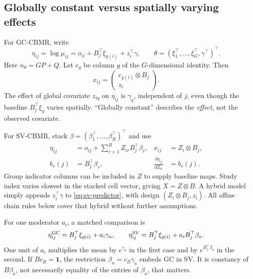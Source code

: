 \documentclass[11pt,a4paper]{article}
\numberwithin{equation}{section}
\begin{document}
\subsection{Globally constant versus spatially varying effects}
For GC-CBMR, write
\begin{equation}\label{eq:gc-predictor}
 \eta_{ij}=\log\mu_{ij}
 =o_{ij}+B_j^\top\xi_{g(i)}+z_i^\top\gamma,\qquad
 \theta=(\xi_1^\top,\ldots,\xi_G^\top,\gamma^\top)^\top.
\end{equation}
Here $n_\theta=GP+Q$. Let $e_g$ be column $g$ of the $G$-dimensional identity.
Then
\begin{equation}
 x_{ij}=\begin{pmatrix}e_{g(i)}\otimes B_j\\z_i\end{pmatrix}.
\end{equation}
The effect of global covariate $z_{iq}$ on $\eta_{ij}$ is $\gamma_q$,
independent of $j$, even though the baseline $B_j^\top\xi_g$ varies spatially.
``Globally constant'' describes the \emph{effect}, not the observed covariate.

For SV-CBMR, stack $\beta=(\beta_1^\top,\ldots,\beta_R^\top)^\top$ and use
\begin{align}
 \eta_{ij}&=o_{ij}+\sum_{r=1}^R Z_{ir}B_j^\top\beta_r,
 &x_{ij}&=Z_i\otimes B_j,\label{eq:sv-predictor}\\
 b_r(j)&=B_j^\top\beta_r,
 &\frac{\partial\eta_{ij}}{\partial Z_{ir}}&=b_r(j).
\end{align}
Group indicator columns can be included in $Z$ to supply baseline maps.
Study index varies slowest in the stacked cell vector, giving $X=Z\otimes B$.
A hybrid model simply appends $z_i^\top\gamma$ to
\eqref{eq:sv-predictor}, with design $(Z_i\otimes B_j,z_i)$.
All affine chain rules below cover that hybrid without further assumptions.

For one moderator $a_i$, a matched comparison is
\[
 \eta_{ij}^{\rm GC}=B_j^\top\xi_{g(i)}+a_i\gamma_a,\qquad
 \eta_{ij}^{\rm SV}=B_j^\top\xi_{g(i)}+a_iB_j^\top\beta_a.
\]
One unit of $a_i$ multiplies the mean by $e^{\gamma_a}$ in the first
case and by $e^{B_j^\top\beta_a}$ in the second.
If $Bc_B=\mathbf1$, the restriction $\beta_a=c_B\gamma_a$
embeds GC in SV. It is constancy of $B\beta_a$, not necessarily
equality of the entries of $\beta_a$, that matters.
\end{document}
